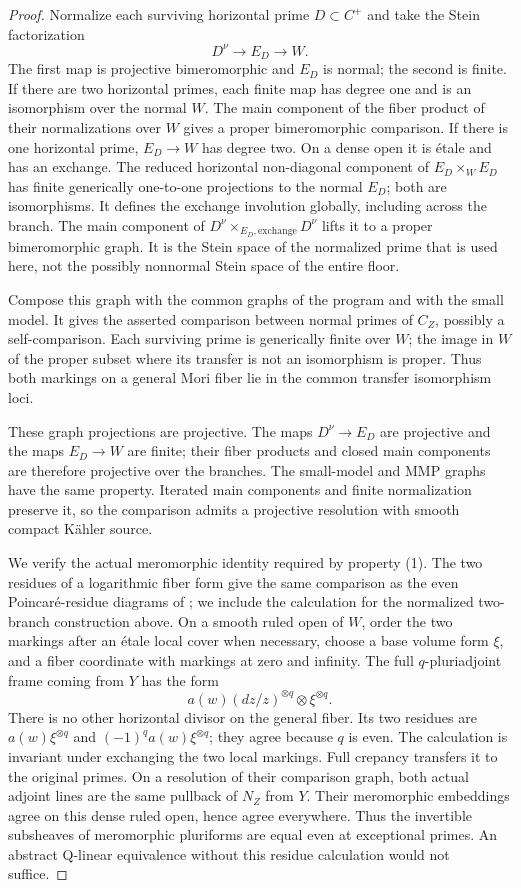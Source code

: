 \begin{proof}
Normalize each surviving horizontal prime \(D\subset C^+\) and take the
Stein factorization
\[
 D^\nu\longrightarrow E_D\longrightarrow W.
\]
The first map is projective bimeromorphic and \(E_D\) is normal; the
second is finite.  If there are two horizontal primes, each finite map
has degree one and is an isomorphism over the normal \(W\).  The main
component of the fiber product of their normalizations over \(W\) gives
a proper bimeromorphic comparison.  If there is one horizontal prime,
\(E_D\to W\) has degree two.  On a dense open it is \'etale and has an
exchange.  The reduced horizontal non-diagonal component of
\(E_D\times_W E_D\) has finite generically one-to-one projections to
the normal \(E_D\); both are isomorphisms.  It defines the exchange
involution globally, including across the branch.  The main component
of \(D^\nu\times_{E_D,\mathrm{exchange}}D^\nu\) lifts it to a proper
bimeromorphic graph.  It is the Stein space of the normalized prime
that is used here, not the possibly nonnormal Stein space of the entire
floor.

Compose this graph with the common graphs of the program and with the
small model.  It gives the asserted comparison between normal primes of
\(C_Z\), possibly a self-comparison.  Each surviving prime is generically
finite over \(W\); the image in \(W\) of the proper subset where its
transfer is not an isomorphism is proper.  Thus both markings on a general
Mori fiber lie in the common transfer isomorphism loci.

These graph projections are projective.  The maps \(D^\nu\to E_D\)
are projective and the maps \(E_D\to W\) are finite; their fiber products
and closed main components are therefore projective over the branches.
The small-model and MMP graphs have the same property.  Iterated main
components and finite normalization preserve it, so the comparison admits
a projective resolution with smooth compact K\"ahler source.

We verify the actual meromorphic identity required by property (1).
The two residues of a logarithmic fiber form give the same comparison
as the even Poincar\'e-residue diagrams of
\cite[Section~3, Definition~13 and Proposition~14]{Kollar2013Sources};
we include the calculation for the normalized two-branch construction
above.
On a smooth ruled open of \(W\), order the two markings after an \'etale
local cover when necessary, choose a base volume form \(\xi\), and a
fiber coordinate with markings at zero and infinity.  The full
\(q\)-pluriadjoint frame coming from \(Y\) has the form
\[
 a(w)(dz/z)^{\otimes q}\otimes\xi^{\otimes q}.
\]
There is no other horizontal divisor on the general fiber.  Its two
residues are \(a(w)\xi^{\otimes q}\) and
\((-1)^q a(w)\xi^{\otimes q}\); they agree because \(q\) is even.
The calculation is invariant under exchanging the two local markings.
Full crepancy transfers it to the original primes.  On a resolution of
their comparison graph, both actual adjoint lines are the same pullback
of \(N_Z\) from \(Y\).  Their meromorphic embeddings agree on this dense
ruled open, hence agree everywhere.  Thus the invertible subsheaves of
meromorphic pluriforms are equal even at exceptional primes.  An abstract
Q-linear equivalence without this residue calculation would not suffice.


\end{proof}
